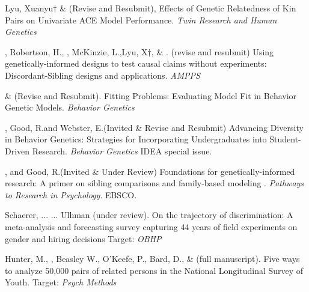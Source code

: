 



\item Lyu, Xuanyu$\dagger$ \&  \meb (Revise and Resubmit), Effects of Genetic Relatedness of Kin Pairs on Univariate ACE Model Performance. \textit{Twin Research and Human Genetics}

\item \meb, Robertson, H.\noteA, \jt, McKinzie, L.,\noteA Lyu, X$\dagger$, \& \joe. (revise and resubmit) Using genetically-informed designs to test causal claims without experiments: Discordant-Sibling designs and applications. \href{https://osf.io/zpdwt/}{\small\color{blue}{osf.io/zpdwt/}} \textit{AMPPS} %

\item \meb \& \joe (Revise and Resubmit). Fitting Problems: Evaluating Model Fit in Behavior Genetic Models. \textit{Behavior Genetics}  \href{https://doi.org/10.31234/osf.io/qys83}{\small\color{blue}{10.31234/osf.io/qys83}}


\item \meb, Good, R.\noteA and Webster, E.\noteA  (Invited \& Revise and Resubmit) Advancing Diversity in Behavior Genetics: Strategies for Incorporating Undergraduates into Student-Driven Research. \textit{Behavior Genetics} IDEA special issue. \href{10.31234/osf.io/9x7wf}{\small\color{blue}{10.31234/osf.io/9x7wf}} 

\item \meb, and Good, R.\noteA (Invited \& Under Review) Foundations for genetically-informed research: A primer on sibling comparisons and family-based modeling
. \textit{Pathways to Research in Psychology}. EBSCO.


\item Schaerer, ... \meb ... Ulhman (under review). On the trajectory of discrimination: A meta-analysis and forecasting survey capturing 44 years of field experiments on gender and hiring decisions  Target: \textit{OBHP}

\item Hunter, M., \meb, Beasley W., O'Keefe, P.,  Bard, D., \& \Joe (full manuscript). Five ways to analyze 50,000 pairs of related persons in the National Longitudinal Survey of Youth.  Target: \textit{Psych Methods}

